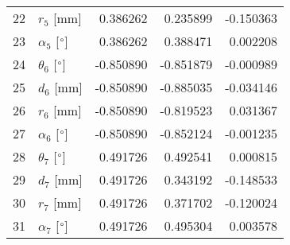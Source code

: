\documentclass{standalone}%
\begin{document}
\begin{tabular}{llrrr}
22 &              $r_{5}$ [mm] &  0.386262 &   0.235899 &  -0.150363 \\
23 &  $\alpha_{5}$ [$\degree$] &  0.386262 &   0.388471 &   0.002208 \\
24 &  $\theta_{6}$ [$\degree$] & -0.850890 &  -0.851879 &  -0.000989 \\
25 &              $d_{6}$ [mm] & -0.850890 &  -0.885035 &  -0.034146 \\
26 &              $r_{6}$ [mm] & -0.850890 &  -0.819523 &   0.031367 \\
27 &  $\alpha_{6}$ [$\degree$] & -0.850890 &  -0.852124 &  -0.001235 \\
28 &  $\theta_{7}$ [$\degree$] &  0.491726 &   0.492541 &   0.000815 \\
29 &              $d_{7}$ [mm] &  0.491726 &   0.343192 &  -0.148533 \\
30 &              $r_{7}$ [mm] &  0.491726 &   0.371702 &  -0.120024 \\
31 &  $\alpha_{7}$ [$\degree$] &  0.491726 &   0.495304 &   0.003578 \\
\bottomrule
\end{tabular}
%
\end{document}
